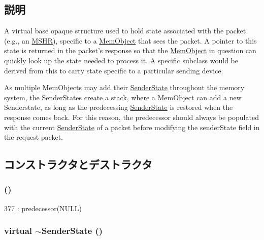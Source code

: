 \subsection{説明}
A virtual base opaque structure used to hold state associated with the packet (e.g., an \hyperlink{classMSHR}{MSHR}), specific to a \hyperlink{classMemObject}{MemObject} that sees the packet. A pointer to this state is returned in the packet's response so that the \hyperlink{classMemObject}{MemObject} in question can quickly look up the state needed to process it. A specific subclass would be derived from this to carry state specific to a particular sending device.

As multiple MemObjects may add their \hyperlink{structPacket_1_1SenderState}{SenderState} throughout the memory system, the SenderStates create a stack, where a \hyperlink{classMemObject}{MemObject} can add a new Senderstate, as long as the predecessing \hyperlink{structPacket_1_1SenderState}{SenderState} is restored when the response comes back. For this reason, the predecessor should always be populated with the current \hyperlink{structPacket_1_1SenderState}{SenderState} of a packet before modifying the senderState field in the request packet. 

\subsection{コンストラクタとデストラクタ}
\hypertarget{structPacket_1_1SenderState_a72a1de46c51baff7fe6dd6f9398309ff}{
\subsubsection[{SenderState}]{ ()}}
\label{structPacket_1_1SenderState_a72a1de46c51baff7fe6dd6f9398309ff}



\begin{DoxyCode}
377 : predecessor(NULL) {}
\end{DoxyCode}
\hypertarget{structPacket_1_1SenderState_a20a824a492d3f182e3f8982771298cfe}{
\subsubsection[{$\sim$SenderState}]{\setlength{\rightskip}{0pt plus 5cm}virtual $\sim${\bf SenderState} ()}}
\label{structPacket_1_1SenderState_a20a824a492d3f182e3f8982771298cfe}



